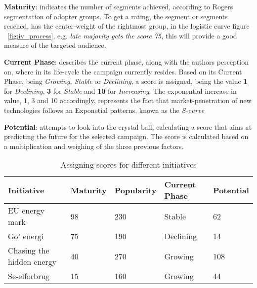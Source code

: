 \documentclass[journal]{IEEEtran}
\begin{document}
\textbf{Maturity}: indicates the number of segments achieved, according to Rogers segmentation of adopter groups. 
To get a rating, the segment or segments reached, has the center-weight of the rightmost group, in the logistic curve figure ~\ref{fig:iv_process}, e.g. \textit{late majority gets the score 75}, this will provide a good measure of the targeted audience.\newline

\textbf{Current Phase}: describes the current phase, along with the authors perception on, where in its life-cycle the campaign currently resides. Based on its Current Phase, being \textit{Growing, Stable} or \textit{Declining}, a score is assigned, being the value \textbf{1} for \textit{Declining}, \textbf{3} for \textit{Stable} and \textbf{10} for \textit{Increasing}. The exponential increase in value, 1, 3 and 10 accordingly, represents the fact that market-penetration of new technologies follows an Exponetial patterns, known as the \textit{S-curve}\cite{rogers_model} \newline

\textbf{Potential}: attempts to look into the crystal ball, calculating a score that aims at predicting the future for the selected campaign. The score is calculated based on a multiplication and weighing of the three previous factors. \newline 


\begin{table}[t2]

\caption{Assigning scores for different initiatives} %
\centering  %

\begin{tabular}{|p{2.5cm} |p{0.9cm} |p{0.9cm} |p{}| p{} |} %
\hline\hline                        %

Initiative & Maturity & Popularity & Current Phase & Potential\\ [0.5ex] %
\hline                  %

EU energy mark & 
98  & 
230 &
Stable &
62 \\
\hline

Go' energi & 
75 & 
190 &
Declining &
14 \\
\hline

Chasing the hidden energy & 
40 & 
270 &
Growing &
108 \\
\hline

Se-elforbrug & 
15  & 
160 &
Growing &
44 \\
\hline
\end{tabular}
\label{table:score} %
\end{table}
\end{document}
